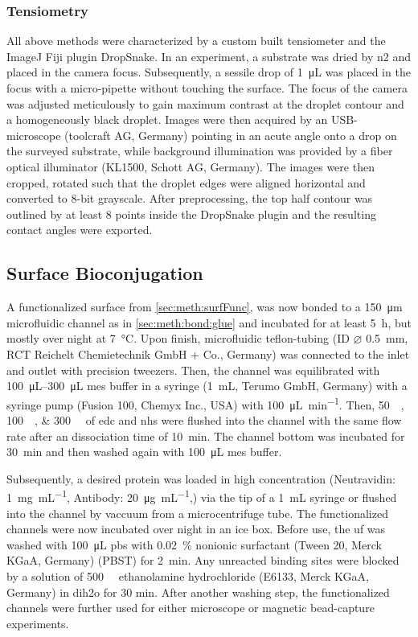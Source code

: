 \subsubsection{Tensiometry}
All above methods were characterized by a custom built tensiometer and the ImageJ Fiji plugin DropSnake. \cite{lit:chem:Fiji,lit:chem:surfaceTension}
In an experiment, a substrate was dried by \gls{n2} and placed in the camera focus. Subsequently, a sessile drop of \SI{1}{\micro\liter} was placed in the focus with a micro-pipette without touching the surface. The focus of the camera was adjusted meticulously to gain maximum contrast at the droplet contour and a homogeneously black droplet. Images were then acquired by an USB-microscope (toolcraft AG, Germany)
pointing in an acute angle onto a drop on the surveyed substrate, while background illumination was provided by a fiber optical illuminator (KL1500, Schott AG, Germany). The images were then cropped, rotated such that the droplet edges were aligned horizontal and converted to 8-bit grayscale. After preprocessing, the top half contour was outlined by at least 8 points inside the DropSnake plugin and the resulting contact angles were exported.
\subsection{Surface Bioconjugation}
\label{sec:meth:surfBio}
A functionalized surface from \ref{sec:meth:surfFunc}, was now bonded to a \SI{150}{\micro\meter} microfluidic channel as in \ref{sec:meth:bond:glue} and incubated for at least \SI{5}{\hour}, but mostly over night at \SI{7}{\degreeCelsius}. Upon finish, microfluidic teflon-tubing (ID $\varnothing$ \SI{0.5}{\milli\meter}, RCT Reichelt Chemietechnik GmbH + Co., Germany)  was connected to the inlet and outlet with precision tweezers. Then, the channel was equilibrated with \SIrange{100}{300}{\micro\liter} \gls{mes} buffer in a syringe (\SI{1}{\milli\liter}, Terumo GmbH, Germany) with a syringe pump (Fusion 100, Chemyx Inc., USA) with \SI{100}{\micro\liter\per\minute}. Then, \SIlist{50;100;300}{\milli\molar} of \gls{edc} and \gls{nhs} were flushed into the channel with the same flow rate after an dissociation time of \SI{10}{\minute}. The channel bottom was incubated for \SI{30}{\minute} and then washed again with \SI{100}{\micro\liter} \gls{mes} buffer. 

Subsequently, a desired protein was loaded in high concentration (Neutravidin: \SI{1}{\milli\gram\per\milli\liter}, Antibody: \SI{20}{\micro\gram\per\milli\liter},) via the tip of a \SI{1}{\milli\liter} syringe or flushed into the channel by vaccuum from a microcentrifuge tube. The functionalized channels were now incubated over night in an ice box. Before use, the \gls{uf} was washed with \SI{100}{\micro\liter} \gls{pbs} with \SI{0.02}{\percent} nonionic surfactant (Tween 20, Merck KGaA, Germany) (PBST) for \SI{2}{\minute}. Any unreacted binding sites were blocked by a solution of \SI{500}{\milli\molar} ethanolamine hydrochloride (E6133, Merck KGaA, Germany) in \gls{dih2o} for 30 min. After another washing step, the functionalized channels were further used for either microscope or magnetic bead-capture experiments.

